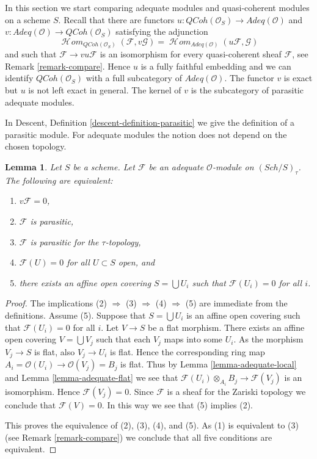 \documentclass{stacks-project}
\theoremstyle{plain}
\newtheorem{lemma}[subsection]{Lemma}
\theoremstyle{definition}
\theoremstyle{remark}
\numberwithin{equation}{subsection}
\def\SheafHom{\mathop{\mathcal{H}\!\mathit{om}}\nolimits}
\def\Sch{\mathit{Sch}}
\def\QCoh{\mathit{QCoh}}
\begin{document}
\noindent
In this section we start comparing adequate modules and quasi-coherent
modules on a scheme $S$. Recall that there are functors
$u : \QCoh(\mathcal{O}_S) \to \textit{Adeq}(\mathcal{O})$
and
$v : \textit{Adeq}(\mathcal{O}) \to \QCoh(\mathcal{O}_S)$
satisfying the adjunction
$$
\SheafHom_{\QCoh(\mathcal{O}_S)}(\mathcal{F}, v\mathcal{G})
=
\SheafHom_{\textit{Adeq}(\mathcal{O})}(u\mathcal{F}, \mathcal{G})
$$
and such that $\mathcal{F} \to vu\mathcal{F}$ is an isomorphism for
every quasi-coherent sheaf $\mathcal{F}$, see
Remark \ref{remark-compare}.
Hence $u$ is a fully faithful embedding and we can identify
$\QCoh(\mathcal{O}_S)$ with a full subcategory of
$\textit{Adeq}(\mathcal{O})$.
The functor $v$ is exact but $u$ is not left exact in general.
The kernel of $v$ is the subcategory of parasitic adequate modules.

\medskip\noindent
In Descent, Definition \ref{descent-definition-parasitic}
we give the definition of a parasitic module.
For adequate modules the notion does not depend
on the chosen topology.

\begin{lemma}
\label{lemma-parasitic-adequate}
Let $S$ be a scheme.
Let $\mathcal{F}$ be an adequate $\mathcal{O}$-module on
$(\Sch/S)_\tau$. The following are equivalent:
\begin{enumerate}
\item $v\mathcal{F} = 0$,
\item $\mathcal{F}$ is parasitic,
\item $\mathcal{F}$ is parasitic for the $\tau$-topology,
\item $\mathcal{F}(U) = 0$ for all $U \subset S$ open, and
\item there exists an affine open covering $S = \bigcup U_i$
such that $\mathcal{F}(U_i) = 0$ for all $i$.
\end{enumerate}
\end{lemma}

\begin{proof}
The implications (2) $\Rightarrow$ (3) $\Rightarrow$ (4) $\Rightarrow$ (5)
are immediate from the definitions. Assume (5). Suppose that
$S = \bigcup U_i$ is an affine open covering such that $\mathcal{F}(U_i) = 0$
for all $i$. Let $V \to S$ be a flat morphism. There exists an affine
open covering $V = \bigcup V_j$ such that each $V_j$ maps into some
$U_i$. As the morphism $V_j \to S$ is flat, also $V_j \to U_i$ is flat. 
Hence the corresponding ring map
$A_i = \mathcal{O}(U_i) \to \mathcal{O}(V_j) = B_j$ is flat. Thus by
Lemma \ref{lemma-adequate-local}
and
Lemma \ref{lemma-adequate-flat}
we see that $\mathcal{F}(U_i) \otimes_{A_i} B_j \to \mathcal{F}(V_j)$
is an isomorphism. Hence $\mathcal{F}(V_j) = 0$. Since $\mathcal{F}$ is
a sheaf for the Zariski topology we conclude that $\mathcal{F}(V) = 0$.
In this way we see that (5) implies (2).

\medskip\noindent
This proves the equivalence of (2), (3), (4), and (5).
As (1) is equivalent to (3) (see
Remark \ref{remark-compare})
we conclude that all five conditions are equivalent.
\end{proof}
\end{document}
